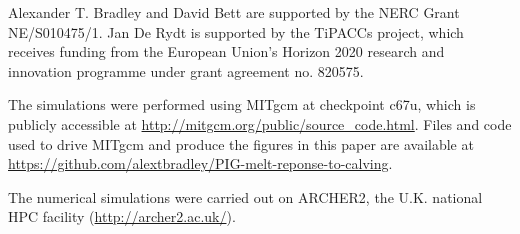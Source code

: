 \documentclass[draft]{agujournal2019}
\begin{document}
%




%
%
%
%
%
%
%
%


\acknowledgments
Alexander T. Bradley and David Bett are supported by the NERC Grant NE/S010475/1. Jan De Rydt is supported by the TiPACCs project, which receives funding from the European Union's Horizon 2020 research and innovation programme under grant agreement no. 820575. 

The simulations were performed using MITgcm at checkpoint c67u, which is publicly accessible at \url{http://mitgcm.org/public/source_code.html}. Files and code used to drive MITgcm and produce the figures in this paper are available at \url{https://github.com/alextbradley/PIG-melt-reponse-to-calving}.

The numerical simulations were carried out on ARCHER2, the U.K. national HPC facility (\url{http://archer2.ac.uk/}).




%
%
\end{document}
